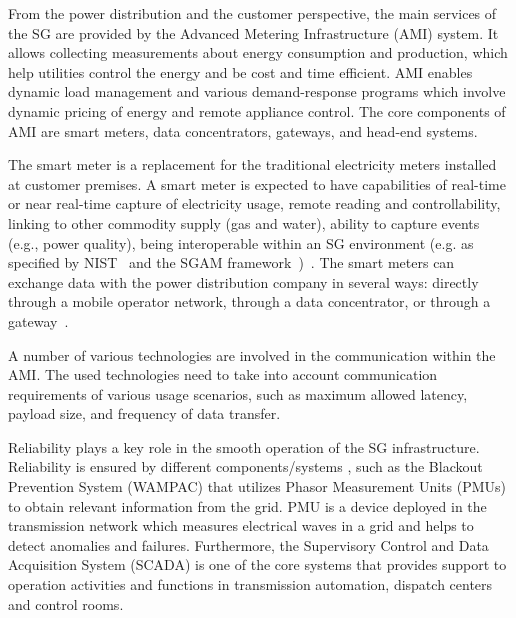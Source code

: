 \documentclass[journal]{IEEEtran}
\begin{document}
From the power distribution and the customer perspective, the main services of the SG are provided by the Advanced Metering Infrastructure (AMI) system. It allows collecting measurements about energy consumption and production, which help utilities control the energy and be cost and time efficient. AMI enables dynamic load management and various demand-response programs which involve dynamic pricing of energy and remote appliance control. The core components of AMI are smart meters, data concentrators, gateways, and head-end systems. 

The smart meter is a replacement for the traditional electricity meters installed at customer premises. A smart meter is expected to have capabilities of real-time or near real-time capture of electricity usage, remote reading and controllability, linking to other commodity supply (gas and water), ability to capture events (e.g., power quality), being interoperable within an SG environment (e.g. as specified by NIST~\cite{ref:nist2010nist} and the SGAM framework~\cite{ref:cen2012group})~\cite{ref:van2006smart}. The smart meters can exchange data with the power distribution company in several ways: directly through a mobile operator network, through a data concentrator, or through a gateway~\cite{ref:chren2016smart}. 

A number of various technologies are involved in the communication within the AMI. The used technologies need to take into account communication requirements of various usage scenarios, such as maximum allowed latency, payload size, and frequency of data transfer. 

Reliability plays a key role in the smooth operation of the SG infrastructure. Reliability is ensured by different components/systems \cite{ref:chren2018SCSP}, such as the Blackout Prevention System (WAMPAC) that utilizes Phasor Measurement Units (PMUs) to obtain relevant information from the grid. PMU is a device deployed in the transmission network which measures electrical waves in a grid and helps to detect anomalies and failures. Furthermore, the Supervisory Control and Data Acquisition System (SCADA) is one of the core systems that provides support to operation activities and functions in transmission automation, dispatch centers and control rooms.
\end{document}
